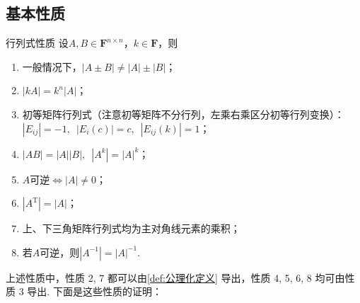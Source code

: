 \subsection{基本性质}

\begin{example}{}{行列式性质}
    设$A,B \in \mathbf{F}^{n \times n}$，$k \in \mathbf{F}$，则
    \begin{enumerate}
        \item 一般情况下，$|A \pm B| \neq |A|\pm|B|$；

        \item $|kA|=k^n|A|$；

        \item \label{item:13:行列式性质:3}
            初等矩阵行列式（注意初等矩阵不分行列，左乘右乘区分初等行列变换）：\\
            $|E_{ij}|=-1,\enspace |E_i(c)|=c,\enspace |E_{ij}(k)|=1$；

        \item \label{item:13:行列式性质:4}
            $|AB|=|A||B|,\enspace|A^k|=|A|^k$；

        \item $A$可逆$\iff |A| \neq 0$；

        \item $|A^\mathrm{T}|=|A|$；

        \item \label{item:13:行列式性质:6}
            上、下三角矩阵行列式均为主对角线元素的乘积；

        \item 若$A$可逆，则$|A^{-1}|=|A|^{-1}$.

    \end{enumerate}
\end{example}

上述性质中，性质 2, 7 都可以由\autoref{def:公理化定义} 导出，性质 4, 5, 6, 8 均可由性质 3 导出. 下面是这些性质的证明：

